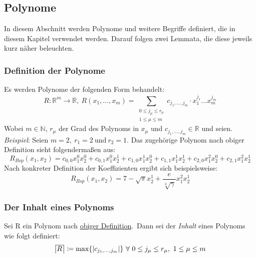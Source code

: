 
\subsection{Polynome}
    \label{subsec:polynomials}
    \textrm{In diesem Abschnitt werden Polynome und weitere Begriffe definiert, die in diesem Kapitel verwendet werden.
    Darauf folgen zwei Lemmata, die diese jeweils kurz näher beleuchten.}
    
    \subsubsection{Definition der Polynome}
        \label{subsubsec:def-poly}
        Es werden Polynome der folgenden Form behandelt:
        \begin{equation}
            R : \mathbb{R}^m \rightarrow \mathbb{R},\
            R(x_1, \dots, x_m) = \sum_{\substack{0 \leq j_\mu \leq r_\mu \\ 1 \leq \mu \leq m}}
            c_{j_1, \dots, j_m} \cdot x_1^{j_1} \dots x_m^{j_m} \label{eq:def-poly}
        \end{equation}
        Wobei $m \in \mathbb{N}$, $r_\mu$ der Grad des Polynoms in $x_\mu$ und $c_{j_1, \dots, j_m} \in
        \mathbb{R}$ und seien.
        \newline \newline
        \emph{Beispiel}: Seien $m = 2,\ r_1 = 2 \  \text{und} \  r_2 = 1$.
        \newline
        \textrm{Das zugehörige Polynom nach obiger Definition sieht folgendermaßen aus:}
        \begin{equation*}
            R_{Bsp}(x_1, x_2) = c_{0,0} x_1^0 x_2^0 + c_{0,1} x_1^0 x_2^1 + c_{1,0} x_1^1 x_2^0 + c_{1,1} x_1^1
            x_2^1 + c_{2, 0} x_1^2 x_2^0 + c_{2,1} x_1^2 x_2^1
        \end{equation*}
        Nach konkreter Definition der Koeffizienten ergibt sich beispielsweise:
        \begin{equation*}
            R_{Bsp}(x_1, x_2) = 7 - \sqrt{\pi} x_2^1 + \frac{e}{\sqrt[3]{\gamma}} x_1^2 x_2^1
        \end{equation*}
    
    \subsubsection{Der Inhalt eines Polynoms}
        \label{subsubsec:content-poly}
        Sei R ein Polynom nach \hyperref[subsubsec:def-poly]{obiger Definition}.\ Dann sei der \emph{Inhalt} eines
        Polynoms wie folgt definiert:
        \begin{equation}
            \content{R} \coloneq \max\{|c_{j_1, \dots, j_m}| \} \  \forall \  0 \leq j_\mu \leq r_\mu, \
            1 \leq \mu \leq m \label{eq:def-content}
        \end{equation}
    
